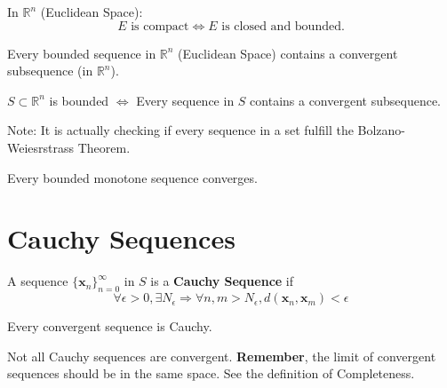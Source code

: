 \begin{theorem}
    In $\mathbb{R}^{n}$ (Euclidean Space): \begin{equation*}
        E \text{ is compact} \iff E \text{ is closed and bounded}.
    \end{equation*}
\end{theorem}

\begin{theorem}
    Every bounded sequence in $\mathbb{R}^{n}$ (Euclidean Space) contains a convergent subsequence (in $\mathbb{R}^{n}$).
\end{theorem}


\begin{proposition}
    $S \subset \mathbb{R}^{n}$ is bounded $\iff$ Every sequence in $S$ contains a convergent subsequence.

    Note: It is actually checking if every sequence in a set fulfill the Bolzano-Weiesrstrass Theorem.
\end{proposition}

\begin{theorem}
    Every bounded monotone sequence converges.
\end{theorem}

\section{Cauchy Sequences}

\begin{definition}
    A sequence $\{\mathbf{x}_n\}_{n=0}^{\infty}$ in $S$ is a \textbf{Cauchy Sequence} if
    \begin{equation*}
        \forall \epsilon > 0, \exists N_{\epsilon} \Rightarrow \forall n,m>N_{\epsilon}, d(\mathbf{x}_n, \mathbf{x}_m) < \epsilon
    \end{equation*}
\end{definition}

\begin{proposition}
    Every convergent sequence is Cauchy.
\end{proposition}

\begin{remark*}
    Not all Cauchy sequences are convergent. \textbf{Remember}, the limit of convergent sequences should be in the same space. See the definition of Completeness.
\end{remark*}

